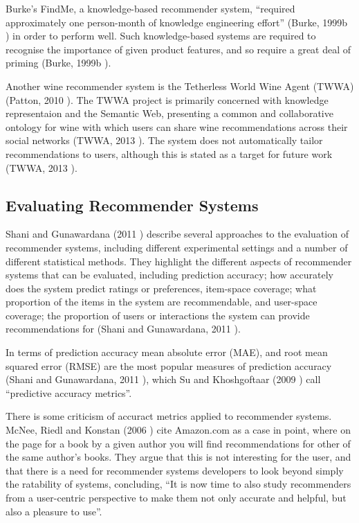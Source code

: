 Burke's FindMe, a knowledge-based recommender system, ``required approximately one person-month of knowledge engineering effort'' (Burke, 1999b \cite{Burke99b}) in order to perform well. Such knowledge-based systems are required to recognise the importance of given product features, and so require a great deal of priming (Burke, 1999b \cite{Burke99b}).

Another wine recommender system is the Tetherless World Wine Agent (TWWA) (Patton, 2010 \cite{Patton10}). The TWWA project is primarily concerned with knowledge representaion and the Semantic Web, presenting a common and collaborative ontology for wine with which users can share wine recommendations across their social networks (TWWA, 2013 \cite{TWWAIndex}). The system does not automatically tailor recommendations to users, although this is stated as a target for future work (TWWA, 2013 \cite{TWWAIndex}).

\subsection{Evaluating Recommender Systems}

Shani and Gunawardana (2011 \cite{Shani11}) describe several approaches to the evaluation of recommender systems, including different experimental settings and a number of different statistical methods. They highlight the different aspects of recommender systems that can be evaluated, including prediction accuracy; how accurately does the system predict ratings or preferences, item-space coverage; what proportion of the items in the system are recommendable, and user-space coverage; the proportion of users or interactions the system can provide recommendations for (Shani and Gunawardana, 2011 \cite{Shani11}).

In terms of prediction accuracy mean absolute error (MAE), and root mean squared error (RMSE) are the most popular measures of prediction accuracy (Shani and Gunawardana, 2011 \cite{Shani11}), which Su and Khoshgoftaar (2009 \cite{Su09}) call ``predictive accuracy metrics''. 

There is some criticism of accuract metrics applied to recommender systems. McNee, Riedl and Konstan (2006 \cite{McNee06}) cite Amazon.com as a case in point, where on the page for a book by a given author you will find recommendations for other of the same author's books. They argue that this is not interesting for the user, and that there is a need for recommender systems developers to look beyond simply the ratability of systems, concluding, ``It is now time to also study recommenders from a user-centric perspective to make them not only accurate and helpful, but also a pleasure to use''.

